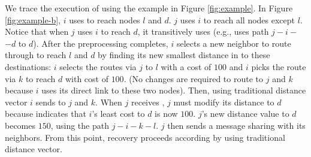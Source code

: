 \begin{figure*}[t]
  \begin{center}
  \end{center}
	\caption{Three snapshots of a graph, $G$, where \bad is the compromised node: (a) $G$ before \bad is compromised, (b) $G$ after \badvector has 
	finished propagating but before recovery has started, and 
	(c) $G$ after recovery. The dashed lines in (b) mark false paths used by \badvectors. Portions of \dmatrixi and \dmatrixj are displayed to the right of each sub-figure. 
	The least cost values are underlined.}
  \label{fig:example}
\end{figure*}


We trace the execution of \second using the example in Figure \ref{fig:example}.
In Figure \ref{fig:example-b}, $i$ uses \bad to reach nodes $l$ and $d$.  $j$ uses $i$ to reach all nodes except $l$.  Notice that when $j$ uses $i$ to reach $d$, 
it transitively uses \badvector (e.g., uses path $j-i-$\bads$-d$ to $d$). 
After the preprocessing completes, $i$ selects a new neighbor to route through to reach $l$ and $d$ by finding its new smallest distance in \dmatrixi 
to these destinations: $i$ selects the routes via $j$ to $l$ with a cost of $100$ and $i$ picks the route via $k$ to reach $d$ with cost of $100$. 
(No changes are required to route to $j$ and $k$ because $i$ uses its direct link to these two nodes). 
Then, using traditional distance vector $i$ sends \minvi to $j$ and $k$.  When $j$ receives \minvis, $j$ must modify its distance to $d$ because \minvi indicates 
that $i$'s least cost to $d$ is now $100$.
$j$'s new distance value to $d$ becomes $150$, using the path $j-i-k-l$. $j$ then sends a message sharing \minvj with its neighbors.  From this point, recovery proceeds according 
by using traditional distance vector. 

